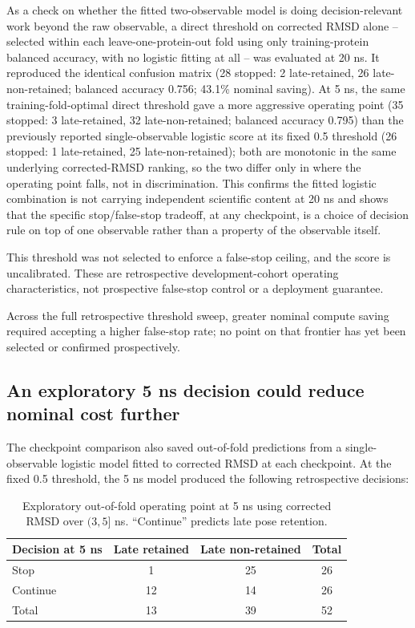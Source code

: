 \documentclass[11pt]{article}
\begin{document}
As a check on whether the fitted two-observable model is doing decision-relevant work beyond the raw observable, a direct threshold on corrected RMSD alone -- selected within each leave-one-protein-out fold using only training-protein balanced accuracy, with no logistic fitting at all -- was evaluated at 20 ns. It reproduced the identical confusion matrix (28 stopped: 2 late-retained, 26 late-non-retained; balanced accuracy 0.756; 43.1\% nominal saving). At 5 ns, the same training-fold-optimal direct threshold gave a more aggressive operating point (35 stopped: 3 late-retained, 32 late-non-retained; balanced accuracy 0.795) than the previously reported single-observable logistic score at its fixed 0.5 threshold (26 stopped: 1 late-retained, 25 late-non-retained); both are monotonic in the same underlying corrected-RMSD ranking, so the two differ only in where the operating point falls, not in discrimination. This confirms the fitted logistic combination is not carrying independent scientific content at 20 ns and shows that the specific stop/false-stop tradeoff, at any checkpoint, is a choice of decision rule on top of one observable rather than a property of the observable itself.

This threshold was not selected to enforce a false-stop ceiling, and the score is uncalibrated. These are retrospective development-cohort operating characteristics, not prospective false-stop control or a deployment guarantee.

Across the full retrospective threshold sweep, greater nominal compute saving required accepting a higher false-stop rate; no point on that frontier has yet been selected or confirmed prospectively.

\subsection{An exploratory 5 ns decision could reduce nominal cost further}

The checkpoint comparison also saved out-of-fold predictions from a single-observable logistic model fitted to corrected RMSD at each checkpoint. At the fixed 0.5 threshold, the 5 ns model produced the following retrospective decisions:

\begin{table}[htbp]
\centering
\caption{Exploratory out-of-fold operating point at 5 ns using corrected RMSD over $(3,5]$ ns. ``Continue'' predicts late pose retention.}
\label{tab:policy-5ns}
\begin{tabular}{lccc}
\toprule
Decision at 5 ns & Late retained & Late non-retained & Total \\
\midrule
Stop & 1 & 25 & 26 \\
Continue & 12 & 14 & 26 \\
\midrule
Total & 13 & 39 & 52 \\
\bottomrule
\end{tabular}
\end{table}
\end{document}
